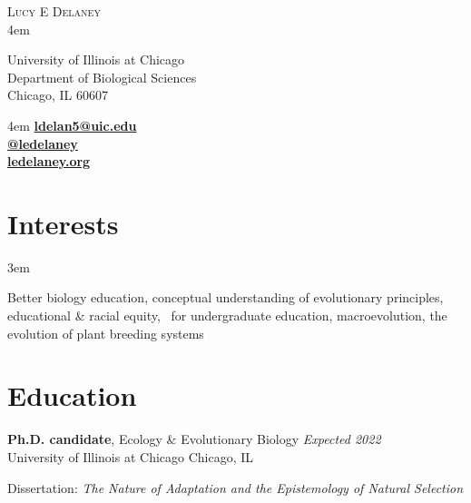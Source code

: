 \documentclass[]{article}
\begin{document}
\BgThispage
\pagestyle{alldocument}

{\fontsize{20}{64}\selectfont \textsc{Lucy E Delaney}}\\
\leftskip 4em
\begin{multicols}{2}

University of Illinois at Chicago\\
Department of Biological Sciences\\
Chicago, IL 60607

\columnbreak

\begin{flushright}
\rightskip 4em
\href{mailto:ldelan5@uic.edu}{\textbf{ldelan5@uic.edu}} \textcolor{light-gray}{\faPaperPlane}\\
\href{https://github.com/ledelaney}{\textbf{@ledelaney}} \textcolor{light-gray}{\faGithub}\\
\href{https://ledelaney.org}{\textbf{ledelaney.org}} \textcolor{light-gray}{\faDesktop}
\end{flushright}

\end{multicols}

\vspace{3mm}

\section{Interests}
\vspace{3mm}

\leftskip 3em

Better biology education, conceptual understanding of evolutionary principles, educational \& racial equity, \textcolor{light-gray}{\faRProject}\ for undergraduate education, macroevolution, the evolution of plant breeding systems

\vspace{3mm}
\section{Education}
\vspace{3mm}

\textbf{Ph.D. candidate}, Ecology \& Evolutionary Biology \hfill \textit{Expected 2022}\\ 
University of Illinois at Chicago \hfill Chicago, IL
     
Dissertation: \emph{The Nature of Adaptation and the Epistemology of Natural Selection} 
\vspace{0.3cm}
\end{document}
